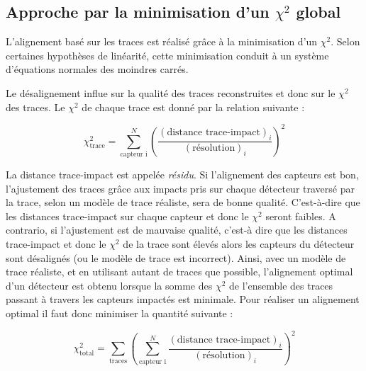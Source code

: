    \subsection{Approche par la minimisation d'un $\chi^2$ global}
   \label{sect:alignGlobal}
   
   L'alignement bas\'e sur les traces est r\'ealis\'e gr\^ace \`a la minimisation d'un $\chi^2$. Selon certaines hypoth\`eses de lin\'earit\'e, cette minimisation conduit \`a un syst\`eme d'\'equations normales des moindres carr\'es.
   
   \medskip
   
   Le d\'esalignement influe sur la qualit\'e des traces reconstruites et donc sur le $\chi^2$ des traces. Le $\chi^2$ de chaque trace est donn\'e par la relation suivante : 
   
   \begin{equation}
    \chi^2_{\text{trace}} = \sum_{\text{capteur i}}^N \left( \dfrac{(\text{distance trace-impact})_i}{(\text{r\'esolution})_i} \right)^2
   \end{equation}
   
   La distance trace-impact est appel\'ee \textit{r\'esidu}. Si l'alignement des capteurs est bon, l'ajustement des traces gr\^ace aux impacts pris sur chaque d\'etecteur travers\'e par la trace, selon un mod\`ele de trace r\'ealiste, sera de bonne qualit\'e. C'est-\`a-dire que les distances trace-impact sur chaque capteur et donc le $\chi^2$ seront faibles. A contrario, si l'ajustement est de mauvaise qualit\'e, c'est-\`a dire que les distances trace-impact et donc le $\chi^2$ de la trace sont \'elev\'es alors les capteurs du d\'etecteur sont d\'esalign\'es (ou le mod\`ele de trace est incorrect). Ainsi, avec un mod\`ele de trace r\'ealiste, et en utilisant autant de traces que possible, l'alignement optimal d'un d\'etecteur est obtenu lorsque la somme des $\chi^2$ de l'ensemble des traces passant \`a travers les capteurs impact\'es est minimale. Pour r\'ealiser un alignement optimal il faut donc minimiser la quantit\'e suivante :
   
   
   \begin{equation}
    \chi^2_{\text{total}} = \sum_{\text{traces}} \left( \sum_{\text{capteur i}}^N \dfrac{(\text{distance trace-impact})_i}{(\text{r\'esolution})_i} \right)^2
   \label{eq:chi2_global}
   \end{equation}
   

